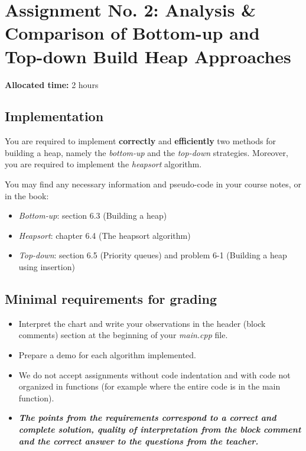\documentclass[../en-fa-lab.tex]{subfiles}
\begin{document}
\section{\texorpdfstring{\textbf{Assignment No. 2: Analysis \& Comparison of Bottom-up and
Top-down Build Heap Approaches}}{Assignment No. 2: Analysis \& Comparison of Bottom-up and
Top-down Build Heap Approaches}}\label{intro-session}

\textbf{Allocated time:} 2 hours

\subsection{Implementation}\label{implementation}

You are required to implement \textbf{correctly} and
\textbf{efficiently} two methods for building a heap, namely the
\emph{bottom-up} and the \emph{top-down} strategies. Moreover, you are
required to implement the \emph{heapsort} algorithm.

You may find any necessary information and pseudo-code in
your course notes, or in the book\citep{cormen}:

\begin{itemize}
\item
  \emph{Bottom-up}: section 6.3 (Building a heap)
\item
  \emph{Heapsort}: chapter 6.4 (The heapsort algorithm)
\item
  \emph{Top-down}: section 6.5 (Priority queues) and
  problem 6-1 (Building a heap using insertion)
\end{itemize}

\subsection{Minimal requirements for
grading}\label{minimal-requirements-for-grading}

\begin{itemize}
\item
  Interpret the chart and write your observations in the header (block
  comments) section at the beginning of your \emph{main.cpp} file.
\end{itemize}

\begin{itemize}
\item
  Prepare a demo for each algorithm implemented.
\item
  We do not accept assignments without code indentation and with code
  not organized in functions (for example where the entire code is in
  the main function).
\item
  \emph{\textbf{The points from the requirements correspond to a correct
  and complete solution, quality of interpretation from the block
  comment and the correct answer to the questions from the teacher.}}
\end{itemize}
\end{document}
